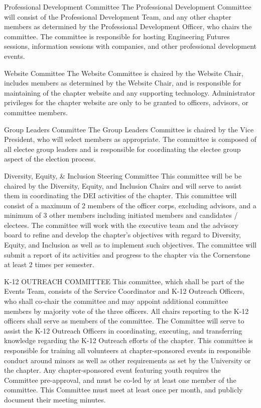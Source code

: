 \begin{enumsubsection}
	\item{Professional Development Committee} The Professional Development Committee will consist of the Professional Development Team, and any other chapter members as determined by the Professional Development Officer, who chairs the committee. The committee is responsible for hosting Engineering Futures sessions, information sessions with companies, and other professional development events.
	\item{Website Committee} \label{com-website} The Website Committee is chaired by the Website Chair, includes members as determined by the Website Chair, and is responsible for maintaining of the chapter website and any supporting technology. Administrator privileges for the chapter website are only to be granted to officers, advisors, or committee members.
	\item{Group Leaders Committee} The Group Leaders Committee is chaired by the Vice President, who will select members as appropriate. The committee is composed of all electee group leaders and is responsible for coordinating the electee group aspect of the election process.
  \item{Diversity, Equity, \& Inclusion  Steering Committee} This committee will be be chaired by the Diversity, Equity, and Inclusion Chairs and will serve to assist them in coordinating the DEI activities of the chapter. This committee will consist of a maximum of 2 members of the officer corps, excluding advisors, and a minimum of 3 other members including initiated members and candidates / electees. The committee will work with the executive team and the advisory board to refine and develop the chapter's objectives with regard to Diversity, Equity, and Inclusion as well as to implement such objectives. The committee will submit a report of its activities and progress to the chapter via the Cornerstone at least 2 times per semester.
  \item{K-12 OUTREACH COMMITTEE} This committee, which shall be part of the Events Team, consists of the Service Coordinator and K-12 Outreach Officers, who shall co-chair the committee and may appoint additional committee members by majority vote of the three officers.  All chairs reporting to the K-12 officers shall serve as members of the committee.  The Committee will serve to assist the K-12 Outreach Officers in coordinating, executing, and transferring knowledge regarding the K-12 Outreach efforts of the chapter. This committee is responsible for training all volunteers at chapter-sponsored events in responsible conduct around minors as well as other requirements as set by the University or the chapter. Any chapter-sponsored event featuring youth requires the Committee pre-approval, and must be co-led by at least one member of the committee. This Committee must meet at least once per month, and publicly document their meeting minutes.
\end{enumsubsection}

